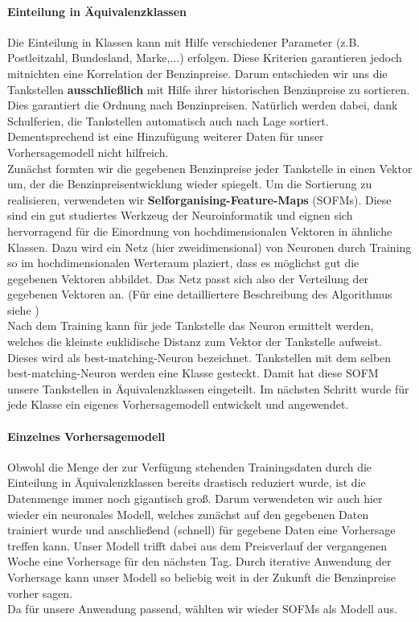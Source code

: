 \documentclass[11pt]{article}
\begin{document}
	\paragraph{Einteilung in Äquivalenzklassen\\}
	Die Einteilung in Klassen kann mit Hilfe verschiedener Parameter (z.B. Postleitzahl, Bundesland, Marke,$\ldots$) erfolgen. Diese Kriterien garantieren jedoch mitnichten eine Korrelation der Benzinpreise. Darum entschieden wir uns die Tankstellen \textbf{ausschließlich} mit Hilfe ihrer historischen Benzinpreise zu sortieren. Dies garantiert die Ordnung nach Benzinpreisen. Natürlich werden dabei, dank Schulferien, die Tankstellen automatisch auch nach Lage sortiert. Dementsprechend ist eine Hinzufügung weiterer Daten für unser Vorhersagemodell nicht hilfreich.\\
	Zunächst formten wir die gegebenen Benzinpreise jeder Tankstelle in einen Vektor um, der die Benzinpreisentwicklung wieder spiegelt. Um die Sortierung zu realisieren, verwendeten wir \textbf{Selforganising-Feature-Maps} (SOFMs). Diese sind ein gut studiertes Werkzeug der Neuroinformatik und eignen sich hervorragend für die Einordnung von hochdimensionalen Vektoren in ähnliche Klassen. Dazu wird ein Netz (hier zweidimensional) von Neuronen durch Training so im hochdimensionalen Werteraum plaziert, dass es möglichst gut die gegebenen Vektoren abbildet. Das Netz passt sich also der Verteilung der gegebenen Vektoren an. (Für eine detailliertere Beschreibung des Algorithmus siehe \cite{SOFM})\\
	Nach dem Training kann für jede Tankstelle das Neuron ermittelt werden, welches die kleinste euklidische Distanz zum Vektor der Tankstelle aufweist. Dieses wird als best-matching-Neuron bezeichnet. Tankstellen mit dem selben best-matching-Neuron werden eine Klasse gesteckt. Damit hat diese SOFM unsere Tankstellen in Äquivalenzklassen  eingeteilt. Im nächsten Schritt wurde für jede Klasse ein eigenes Vorhersagemodell entwickelt und angewendet.\\
	
	\paragraph{Einzelnes Vorhersagemodell\\}
	Obwohl die Menge der zur Verfügung stehenden Trainingsdaten durch die Einteilung in Äquivalenzklassen bereits drastisch reduziert wurde, ist die Datenmenge immer noch gigantisch groß. Darum verwendeten wir auch hier wieder ein neuronales Modell, welches zunächst auf den gegebenen Daten trainiert wurde und anschließend (schnell) für gegebene Daten eine Vorhersage treffen kann. Unser Modell trifft dabei aus dem Preisverlauf der vergangenen Woche eine Vorhersage für den nächsten Tag. Durch iterative Anwendung der Vorhersage kann unser Modell so beliebig weit in der Zukunft die Benzinpreise vorher sagen.\\
	Da für unsere Anwendung passend, wählten wir wieder SOFMs als Modell aus. 
	
\end{document}
